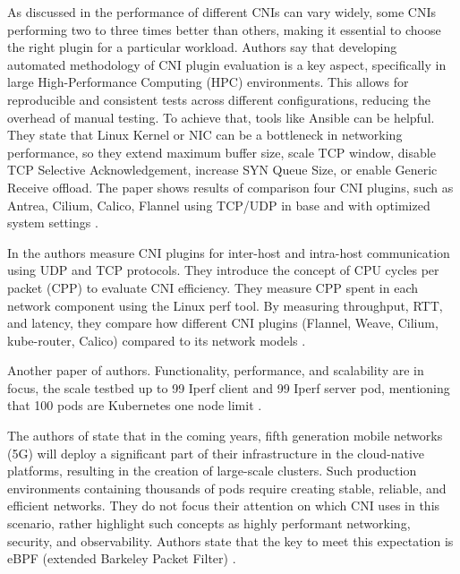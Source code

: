 As discussed in \cite{dakic2024performance} the performance of different CNIs can vary widely, some CNIs performing two to three times better than others, making it essential to choose the right plugin for a particular workload. Authors say that developing automated methodology of CNI plugin evaluation is a key aspect, specifically in large High-Performance Computing (HPC) environments. This allows for reproducible and consistent tests across different configurations, reducing the overhead of manual testing. To achieve that, tools like Ansible can be helpful. They state that Linux Kernel or NIC can be a bottleneck in networking performance, so they extend maximum buffer size, scale TCP window, disable TCP Selective Acknowledgement, increase SYN Queue Size, or enable Generic Receive offload. The paper shows results of comparison four CNI plugins, such as Antrea, Cilium, Calico, Flannel using TCP/UDP in base and with optimized system settings \cite{dakic2024performance}. 

In \cite{9153266} the authors measure CNI plugins for inter-host and intra-host communication using UDP and TCP protocols. They introduce the concept of CPU cycles per packet (CPP) to evaluate CNI efficiency. They measure CPP spent in each network component using the Linux perf tool. By measuring throughput, RTT, and latency, they compare how different CNI plugins (Flannel, Weave, Cilium, kube-router, Calico) compared to its network models \cite{9153266}. 

Another paper \cite{9309003} of \cite{9153266} authors. Functionality, performance, and scalability are in focus, the scale testbed up to 99 Iperf client and 99 Iperf server pod, mentioning that 100 pods are Kubernetes one node limit \cite{9309003}. 

The authors of \cite{10138542} state that in the coming years, fifth generation mobile networks (5G) will deploy a significant part of their infrastructure in the cloud-native platforms, resulting in the creation of large-scale clusters. Such production environments containing thousands of pods require creating stable, reliable, and efficient networks. They do not focus their attention on which CNI uses in this scenario, rather highlight such concepts as highly performant networking, security, and observability. Authors state that the key to meet this expectation is eBPF (extended Barkeley Packet Filter) \cite{10138542}. 
